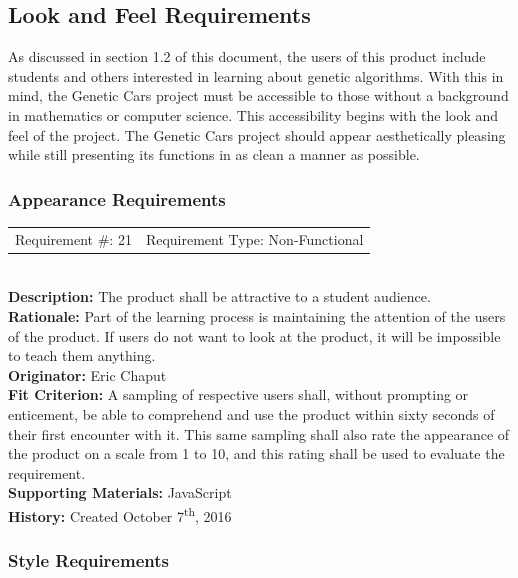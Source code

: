 \documentclass[12pt, titlepage]{article}
\begin{document}
\subsection{Look and Feel Requirements}

As discussed in section 1.2 of this document, the users of this product include 
students and others interested in learning about genetic algorithms. With this 
in mind, the Genetic Cars project must be accessible to those without a 
background in mathematics or computer science. This accessibility begins with 
the look and feel of the project. The Genetic Cars project should appear 
aesthetically pleasing while still presenting its functions in as clean a manner 
as possible.

\subsubsection{Appearance Requirements}

\begin{reqbox}
%
\begin{tabular}{cc}
Requirement \#: 21 & Requirement Type: Non-Functional \\
\end{tabular} \\
%
\textbf{Description:} The product shall be attractive to a student audience. \\
\textbf{Rationale:}  Part of the learning process is maintaining the attention of the users of the product. If users do not want to look at the product, it will be impossible to teach them anything.\\
\textbf{Originator:} Eric Chaput\\
\textbf{Fit Criterion:} A sampling of respective users shall, without prompting or enticement, be able to comprehend and use the product within sixty seconds of their first encounter with it. This same sampling shall also rate the appearance of the product on a scale from 1 to 10, and this rating shall be used to evaluate the requirement.\\
%  
\textbf{Supporting Materials:} JavaScript \\
\textbf{History:} Created October 7\textsuperscript{th}, 2016
%
\end{reqbox}

\newpage

\subsubsection{Style Requirements}
\end{document}
